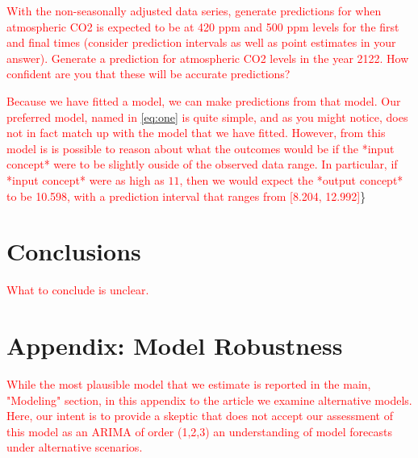 \documentclass[AER]{AEA}
\begin{document}
\textcolor{red}{With the non-seasonally adjusted data series, generate predictions for when atmospheric CO2 is expected to be at 420 ppm and 500 ppm levels for the first and final times (consider prediction intervals as well as point estimates in your answer). Generate a prediction for atmospheric CO2 levels in the year 2122. How confident are you that these will be accurate predictions?}

\textcolor{red}{Because we have fitted a model, we can make predictions from that model. Our preferred model, named in \autoref{eq:one} is quite simple, and as you might notice, does not in fact match up with the model that we have fitted. However, from this model is is possible to reason about what the outcomes would be if the *input concept* were to be slightly ouside of the observed data range. In particular, if *input concept* were as high as $11$, then we would expect the *output concept* to be 10.598, with a prediction interval that ranges from [8.204, 12.992]}\}

\hypertarget{conclusions}{%
\section{Conclusions}\label{conclusions}}

\textcolor{red}{What to conclude is unclear. }




\appendix
\section{Appendix: Model Robustness}

\textcolor{red}{While the most plausible model that we estimate is reported in the main, "Modeling" section, in this appendix to the article we examine alternative models. Here, our intent is to provide a skeptic that does not accept our assessment of this model as an ARIMA of order (1,2,3) an understanding of model forecasts under alternative scenarios. }
\end{document}
